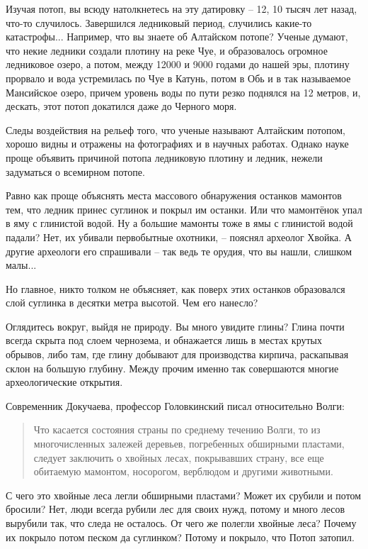    Изучая потоп, вы всюду натолкнетесь на эту датировку – 12, 10 тысяч лет назад, что-то случилось. Завершился ледниковый период, случились какие-то катастрофы... Например, что вы знаете об Алтайском потопе? Ученые думают, что некие ледники создали плотину на реке Чуе, и образовалось огромное ледниковое озеро, а потом, между 12000 и 9000 годами до нашей эры, плотину прорвало и вода устремилась по Чуе в Катунь, потом в Обь и в так называемое Мансийское озеро, причем уровень воды по пути резко поднялся на 12 метров, и, дескать, этот потоп докатился даже до Черного моря.

   Следы воздействия на рельеф того, что ученые называют Алтайским потопом, хорошо видны и отражены на фотографиях и в научных работах. Однако науке проще объявить причиной потопа ледниковую плотину и ледник, нежели задуматься о всемирном потопе.

   Равно как проще объяснять места массового обнаружения останков мамонтов тем, что ледник принес суглинок и покрыл им останки. Или что мамонтёнок упал в яму с глинистой водой. Ну а большие мамонты тоже в ямы с глинистой водой падали? Нет, их убивали первобытные охотники, – пояснял археолог Хвойка. А другие археологи его спрашивали – так ведь те орудия, что вы нашли, слишком малы...

   Но главное, никто толком не объясняет, как поверх этих останков образовался слой суглинка в десятки метра высотой. Чем его нанесло?

   Оглядитесь вокруг, выйдя не природу. Вы много увидите глины? Глина почти всегда скрыта под слоем чернозема, и обнажается лишь в местах крутых обрывов, либо там, где глину добывают для производства кирпича, раскапывая склон на большую глубину. Между прочим именно так совершаются многие археологические открытия.

   Современник Докучаева, профессор Головкинский писал относительно Волги: 

\begin{quotation}
Что касается состояния страны по среднему течению Волги, то из многочисленных залежей деревьев, погребенных обширными пластами, следует заключить о хвойных лесах, покрывавших страну, все еще обитаемую мамонтом, носорогом, верблюдом и другими животными.
\end{quotation}

С чего это хвойные леса легли обширными пластами? Может их срубили и потом бросили? Нет, люди всегда рубили лес для своих нужд, потому и много лесов вырубили так, что следа не осталось. От чего же полегли хвойные леса? Почему их покрыло потом песком да суглинком? Потому и покрыло, что Потоп затопил.

